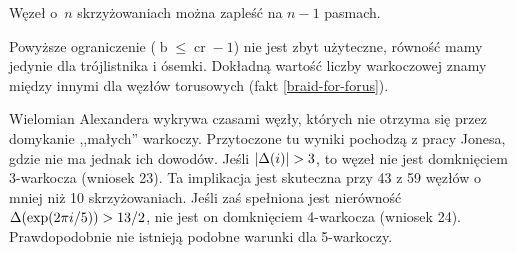 \begin{proposition}
    Węzeł o~$n$ skrzyżowaniach można zapleść na $n - 1$ pasmach.
\end{proposition}

Powyższe ograniczenie ($\operatorname{b} \le \operatorname{cr} - 1$) nie jest zbyt użyteczne, równość mamy jedynie dla trójlistnika i ósemki.
Dokładną wartość liczby warkoczowej znamy między innymi dla węzłów torusowych (fakt \ref{braid-for-forus}).

Wielomian Alexandera wykrywa czasami węzły, których nie otrzyma się przez domykanie ,,małych'' warkoczy.
Przytoczone tu wyniki pochodzą z pracy \cite{jones85} Jonesa, gdzie nie ma jednak ich dowodów.
Jeśli $|\Delta(i)| > 3$, to węzeł nie jest domknięciem 3-warkocza (wniosek 23).
Ta implikacja jest skuteczna przy 43 z 59 węzłów o mniej niż 10 skrzyżowaniach.
Jeśli zaś spełniona jest nierówność $\Delta (\exp (2\pi i / 5)) > 13/2$, nie jest on domknięciem 4-warkocza (wniosek 24).
Prawdopodobnie nie istnieją podobne warunki dla 5-warkoczy.


